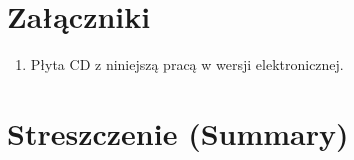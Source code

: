 \documentclass[12pt]{mwbk}
\theoremstyle{plain}
\theoremstyle{definition}
\theoremstyle{remark}
\begin{document}
\listoffigures

\listoftables


\chapter*{Załączniki}
\begin{enumerate}
\item Płyta CD z niniejszą pracą w wersji elektronicznej.
\end{enumerate}




\chapter*{Streszczenie (Summary)}

\bigskip
\bigskip

\begin{center}
  \textbf{\tytul}
\end{center}



\bigskip

\begin{center}
  \textbf{\textit{\tytulangielski}}
\end{center}



{\it

}
\end{document}
